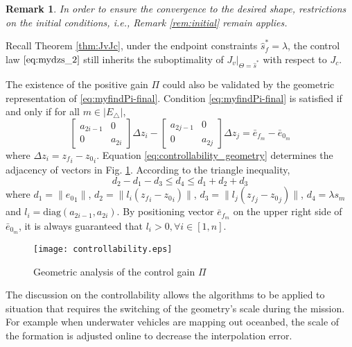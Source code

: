 \documentclass[times]{rncauth}
\newtheorem{rem}{Remark}[section]
\begin{document}
\begin{rem}
  In order to ensure the convergence to the desired shape,
  restrictions on the initial conditions, i.e., Remark
  \ref{rem:initial} remain applies.
\end{rem}


Recall Theorem \ref{thm:JvJc}, under the endpoint constraints
  $\hat{s}^*_f=\lambda$, the control law $\eqref{eq:mydzs_2}$ still inherits
the suboptimality of $J_v|_{\Theta=\hat{s}^*}$ with respect to
$J_c$.



The existence of the positive gain $\Pi$ could also be validated by
the geometric representation of \eqref{eq:myfindPi-final}. Condition
\eqref{eq:myfindPi-final} is satisfied if and only if for all
$m\in|E_\triangle|$,
\begin{equation}\label{eq:controllability_geometry}
  \begin{bmatrix}
    a_{2i-1}&0\\0&a_{2i}
  \end{bmatrix}\Delta z_i
  -
\begin{bmatrix}
    a_{2j-1}&0\\0&a_{2j}
  \end{bmatrix}\Delta z_j
  =
  \bar{e}_{f_m}-\bar{e}_{0_m}
\end{equation}
where $\Delta z_i={z_f}_i-{z_0}_i$. Equation
\eqref{eq:controllability_geometry} determines the adjacency of
vectors in Fig. \ref{fig:controllability}. According to the triangle
inequality,
$$d_2-d_1-d_3\leq d_4 \leq d_1+d_2+d_3$$ where
$d_1=\|{e_0}_1\|$, $d_2=\|l_i({z_f}_i-{z_0}_i)\|$,
$d_3=\|l_j({z_f}_j-{z_0}_j)\|$, $d_4=\lambda s_m$ and
$l_i=\text{diag}(a_{2i-1},a_{2i})$. By positioning vector
$\bar{e}_{f_m}$ on the upper right side of $\bar{e}_{0_m}$, it is
always guaranteed that $l_i>0,\forall i\in[1,n]$.

\begin{figure}
\begin{center}
\texttt{[image: controllability.eps]}
\caption{Geometric analysis of the control gain $\Pi$}
\label{fig:controllability}
\end{center}
\end{figure}

The discussion on the controllability allows the algorithms to be
applied to situation that requires the switching of the geometry's
scale during the mission. For example when underwater vehicles are
mapping out oceanbed\cite{Kalantar08scale}, the scale of the
formation is adjusted online to decrease the interpolation error.
\end{document}
